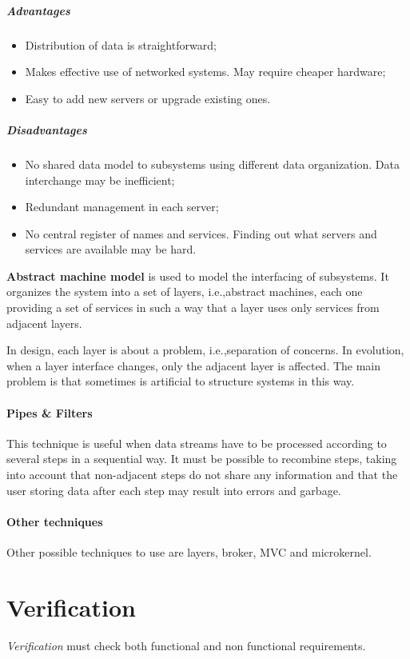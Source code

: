 \subparagraph{Advantages}
\begin{itemize}
\item Distribution of data is straightforward;
\item Makes effective use of networked systems. May require cheaper hardware;
\item Easy to add new servers or upgrade existing ones.
\end{itemize}

\subparagraph{Disadvantages}
\begin{itemize}
\item No shared data model to subsystems using different data organization. Data interchange may be inefficient;
\item Redundant management in each server;
\item No central register of names and services. Finding out what servers and services are available may be hard.
\end{itemize}

\textbf{Abstract machine model} is used to model the interfacing of subsystems. It organizes the system into a set of layers, i.e.,\@ abstract machines, each one providing a set of services in such a way that a layer uses only services from adjacent layers.

In design, each layer is about a problem, i.e.,\@ separation of concerns. In evolution, when a layer interface changes, only the adjacent layer is affected. The main problem is that sometimes is artificial to structure systems in this way.

\paragraph{Pipes \& Filters}
This technique is useful when data streams have to be processed according to several steps in a sequential way. It must be possible to recombine steps, taking into account that non-adjacent steps do not share any information and that the user storing data after each step may result into errors and garbage.

\paragraph{Other techniques}
Other possible techniques to use are layers, broker, MVC and microkernel.

\section{Verification}
\emph{Verification} must check both functional and non functional requirements.

